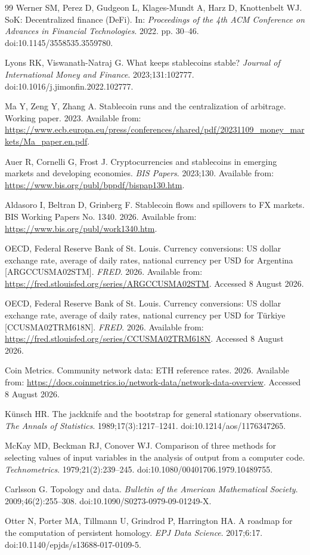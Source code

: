 \documentclass[sn-vancouver,Numbered]{sn-jnl}
\begin{document}
\begin{thebibliography}{99}
Werner SM, Perez D, Gudgeon L, Klages-Mundt A, Harz D, Knottenbelt WJ.
SoK: Decentralized finance (DeFi).
In: \textit{Proceedings of the 4th ACM Conference on Advances in Financial Technologies}. 2022. pp. 30--46.
doi:10.1145/3558535.3559780.

Lyons RK, Viswanath-Natraj G.
What keeps stablecoins stable?
\textit{Journal of International Money and Finance}. 2023;131:102777.
doi:10.1016/j.jimonfin.2022.102777.

Ma Y, Zeng Y, Zhang A.
Stablecoin runs and the centralization of arbitrage.
Working paper. 2023.
Available from: \url{https://www.ecb.europa.eu/press/conferences/shared/pdf/20231109_money_markets/Ma_paper.en.pdf}.

Auer R, Cornelli G, Frost J.
Cryptocurrencies and stablecoins in emerging markets and developing economies.
\textit{BIS Papers}. 2023;130.
Available from: \url{https://www.bis.org/publ/bppdf/bispap130.htm}.

Aldasoro I, Beltran D, Grinberg F.
Stablecoin flows and spillovers to FX markets.
BIS Working Papers No. 1340. 2026.
Available from: \url{https://www.bis.org/publ/work1340.htm}.

OECD, Federal Reserve Bank of St. Louis.
Currency conversions: US dollar exchange rate, average of daily rates, national currency per USD for Argentina [ARGCCUSMA02STM].
\textit{FRED}. 2026.
Available from: \url{https://fred.stlouisfed.org/series/ARGCCUSMA02STM}. Accessed 8 August 2026.

OECD, Federal Reserve Bank of St. Louis.
Currency conversions: US dollar exchange rate, average of daily rates, national currency per USD for T\"urkiye [CCUSMA02TRM618N].
\textit{FRED}. 2026.
Available from: \url{https://fred.stlouisfed.org/series/CCUSMA02TRM618N}. Accessed 8 August 2026.

Coin Metrics.
Community network data: ETH reference rates.
2026. Available from: \url{https://docs.coinmetrics.io/network-data/network-data-overview}. Accessed 8 August 2026.

K\"unsch HR.
The jackknife and the bootstrap for general stationary observations.
\textit{The Annals of Statistics}. 1989;17(3):1217--1241.
doi:10.1214/aos/1176347265.

McKay MD, Beckman RJ, Conover WJ.
Comparison of three methods for selecting values of input variables in the analysis of output from a computer code.
\textit{Technometrics}. 1979;21(2):239--245.
doi:10.1080/00401706.1979.10489755.

Carlsson G.
Topology and data.
\textit{Bulletin of the American Mathematical Society}. 2009;46(2):255--308.
doi:10.1090/S0273-0979-09-01249-X.

Otter N, Porter MA, Tillmann U, Grindrod P, Harrington HA.
A roadmap for the computation of persistent homology.
\textit{EPJ Data Science}. 2017;6:17.
doi:10.1140/epjds/s13688-017-0109-5.

\end{thebibliography}
\end{document}
